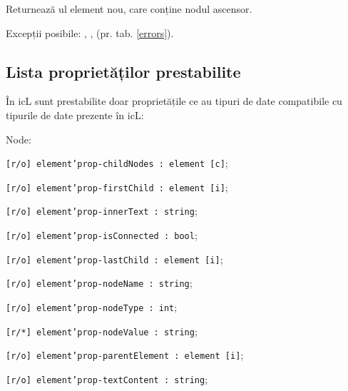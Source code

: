 Returnează ul element nou, care conține nodul ascensor.

Excepții posibile: , ,  (pr. tab. \ref{errors}).

\subsection{Lista proprietăților prestabilite}
\label{elements:predefined:properties}

În icL sunt prestabilite doar proprietățile ce au tipuri de date compatibile cu tipurile de date prezente în icL:
\begin{icItems}
	\item Node:	
	\begin{icItems}
		\item \texttt{[r/o] element'prop-childNodes : element [c]};
		\item \texttt{[r/o] element'prop-firstChild : element [i]};
		\item \texttt{[r/o] element'prop-innerText : string};
		\item \texttt{[r/o] element'prop-isConnected : bool};
		\item \texttt{[r/o] element'prop-lastChild : element [i]};
		\item \texttt{[r/o] element'prop-nodeName : string};
		\item \texttt{[r/o] element'prop-nodeType : int};
		\item \texttt{[r/*] element'prop-nodeValue : string};
		\item \texttt{[r/o] element'prop-parentElement : element [i]};
		\item \texttt{[r/o] element'prop-textContent : string};
	\end{icItems}
	

\end{icItems}
